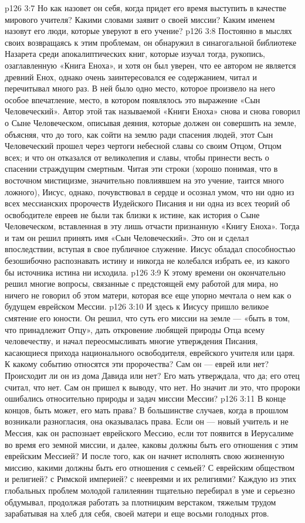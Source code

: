 \vs p126 3:7 Но как назовет он себя, когда придет его время выступить в качестве мирового учителя? Какими словами заявит о своей миссии? Каким именем назовут его люди, которые уверуют в его учение?
\vs p126 3:8 \pc Постоянно в мыслях своих возвращаясь к этим проблемам, он обнаружил в синагогальной библиотеке Назарета среди апокалиптических книг, которые изучал тогда, рукопись, озаглавленную «Книга Еноха», и хотя он был уверен, что ее автором не является древний Енох, однако очень заинтересовался ее содержанием, читал и перечитывал много раз. В ней было одно место, которое произвело на него особое впечатление, место, в котором появлялось это выражение «Сын Человеческий». Автор этой так называемой «Книги Еноха» снова и снова говорил о Сыне Человеческом, описывая деяния, которые должен он совершить на земле, объясняя, что до того, как сойти на землю ради спасения людей, этот Сын Человеческий прошел через чертоги небесной славы со своим Отцом, Отцом всех; и что он отказался от великолепия и славы, чтобы принести весть о спасении страждущим смертным. Читая эти строки (хорошо понимая, что в восточном мистицизме, значительно повлиявшем на это учение, таится много ложного), Иисус, однако, почувствовал в сердце и осознал умом, что ни одно из всех мессианских пророчеств Иудейского Писания и ни одна из всех теорий об освободителе евреев не были так близки к истине, как история о Сыне Человеческом, вставленная в эту лишь отчасти признанную «Книгу Еноха». Тогда и там он решил принять имя «Сын Человеческий». Это он и сделал впоследствии, вступая в свое публичное служение. Иисус обладал способностью безошибочно распознавать истину и никогда не колебался избрать ее, из какого бы источника истина ни исходила.
\vs p126 3:9 К этому времени он окончательно решил многие вопросы, связанные с предстоящей ему работой для мира, но ничего не говорил об этом матери, которая все еще упорно мечтала о нем как о будущем еврейском Мессии.
\vs p126 3:10 И здесь к Иисусу пришло великое смятение его юности. Он решил, что суть его миссии на земле --- «быть в том, что принадлежит Отцу», дать откровение любящей природы Отца всему человечеству, и начал переосмысливать многие утверждения Писания, касающиеся прихода национального освободителя, еврейского учителя или царя. К какому событию относятся эти пророчества? Сам он --- еврей или нет? Происходит ли он из дома Давида или нет? Его мать утверждала, что да; его отец считал, что нет. Сам он пришел к выводу, что нет. Но значит ли это, что пророки ошибались относительно природы и задач миссии Мессии?
\vs p126 3:11 В конце концов, быть может, его мать права? В большинстве случаев, когда в прошлом возникали разногласия, она оказывалась права. Если он --- новый учитель и не Мессия, как он распознает еврейского Мессию, если тот появится в Иерусалиме во время его земной миссии, и далее, каковы должны быть его отношения с этим еврейским Мессией? И после того, как он начнет исполнять свою жизненную миссию, какими должны быть его отношения с семьей? С еврейским обществом и религией? с Римской империей? с неевреями и их религиями? Каждую из этих глобальных проблем молодой галилеянин тщательно перебирал в уме и серьезно обдумывал, продолжая работать за плотницким верстаком, тяжелым трудом зарабатывая на хлеб для себя, своей матери и еще восьми голодных ртов.
